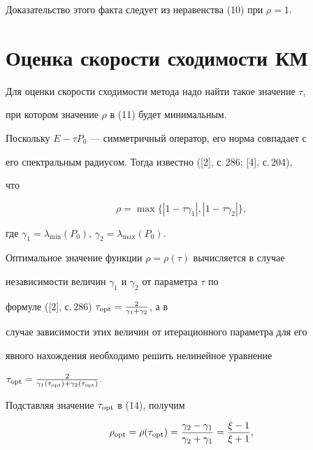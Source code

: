  


Доказательство этого факта следует из неравенства (10) при $\rho=1$. 


 


\section{Оценка скорости сходимости КМ} 


 


Для оценки скорости сходимости метода надо найти такое значение $\tau$, 


при котором значение $\rho$ в (11) будет минимальным. 


 


Поскольку $E-\tau P_0$ --- симметричный оператор, его норма совпадает с 


его спектральным радиусом. Тогда известно ([2], с.\,286; [4], с.\,204), 


что 


\begin{equation} 


\rho=\max\{|1-\tau\gamma_1|,|1-\tau\gamma_2|\}, 


\end{equation} 


где $\gamma_1=\lambda_{\min}(P_0)$, $\gamma_2=\lambda_{\max}(P_0)$. 


 


Оптимальное значение функции $\rho=\rho(\tau)$ вычисляется в случае 


независимости величин $\gamma_1$ и $\gamma_2$ от параметра $\tau$ по 


формуле ([2], с.\,286) $\tau_{\operatorname{opt}}=\frac{2}{\gamma_1+\gamma_2}$, а в 


случае зависимости этих величин от итерационного параметра для его 


явного нахождения необходимо решить нелинейное уравнение 


$\tau_{\operatorname{opt}}=\frac{2}{\gamma_1(\tau_{\operatorname{opt}})+\gamma_2(\tau_{\operatorname{opt}})}$. 


Подставляя значение $\tau_{\operatorname{opt}}$ в (14), получим 


\begin{equation} 


\rho_{\opt}=\rho(\tau_{\opt})= 


\frac{\gamma_2-\gamma_1}{\gamma_2+\gamma_1}= 


\frac{\xi-1}{\xi+1}, 


\end{equation} 


